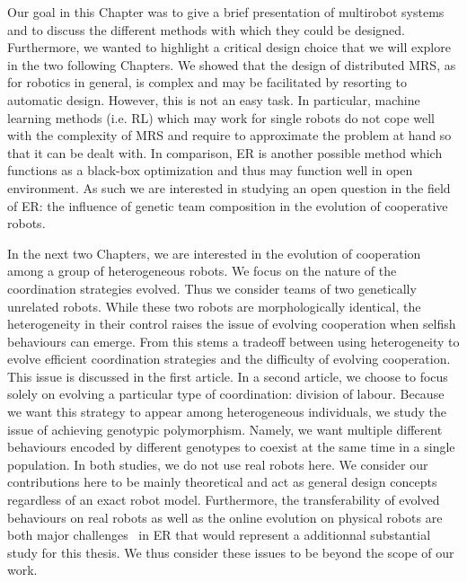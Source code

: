   Our goal in this Chapter was to give a brief presentation of multirobot systems and to discuss the different methods with which they could be designed. Furthermore, we wanted to highlight a critical design choice that we will explore in the two following Chapters. We showed that the design of distributed MRS, as for robotics in general, is complex and may be facilitated by resorting to automatic design. However, this is not an easy task. In particular, machine learning methods (i.e. RL) which may work for single robots do not cope well with the complexity of MRS and require to approximate the problem at hand so that it can be dealt with. In comparison, ER is another possible method which functions as a black-box optimization and thus may function well in open environment. As such we are interested in studying an open question in the field of ER: the influence of genetic team composition in the evolution of cooperative robots.


  In the next two Chapters, we are interested in the evolution of cooperation among a group of heterogeneous robots. We focus on the nature of the coordination strategies evolved. Thus we consider teams of two genetically unrelated robots. While these two robots are morphologically identical, the heterogeneity in their control raises the issue of evolving cooperation when selfish behaviours can emerge. From this stems a tradeoff between using heterogeneity to evolve efficient coordination strategies and the difficulty of evolving cooperation. This issue is discussed in the first article. In a second article, we choose to focus solely on evolving a particular type of coordination: division of labour. Because we want this strategy to appear among heterogeneous individuals, we study the issue of achieving genotypic polymorphism. Namely, we want multiple different behaviours encoded by different genotypes to coexist at the same time in a single population. In both studies, we do not use real robots here. We consider our contributions here to be mainly theoretical and act as general design concepts regardless of an exact robot model. Furthermore, the transferability of evolved behaviours on real robots as well as the online evolution on physical robots are both major challenges~\parencite{Floreano2008, Doncieux2015a} in ER that would represent a additionnal substantial study for this thesis. We thus consider these issues to be beyond the scope of our work.

